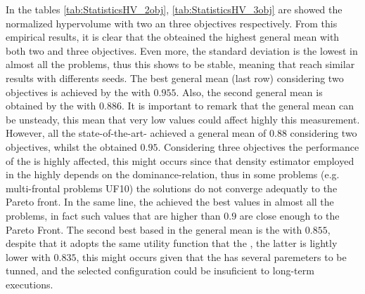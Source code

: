 In the tables \ref{tab:StatisticsHV_2obj}, \ref{tab:StatisticsHV_3obj} are showed the normalized hypervolume with two an three objectives respectively.
%
From this empirical results, it is clear that the \VSDMOEA{} obteained the highest general mean \HV{} with both two and three objectives.
%
Even more, the standard deviation is the lowest in almost all the problems, thus this \MOEA{} shows to be stable, meaning that reach similar results with differents seeds.
%
The best general mean (last row) considering two objectives is achieved by the \VSDMOEA{} with $0.955$.
%
Also, the second general mean is obtained by the \NSGAII{} with $0.886$.
%
It is important to remark that the general mean can be unsteady, this mean that very low \HV{} values could affect highly this measurement.
%
However, all the state-of-the-art-\MOEAS{} achieved a general mean of $0.88$ considering two objectives, whilst the \VSDMOEA{} obtained $0.95$.
%
Considering three objectives the performance of the \NSGAII{} is highly affected, this might occurs since that density estimator employed in the \NSGAII{} highly depends on the dominance-relation, thus in some problems (e.g. multi-frontal problems UF10) the solutions do not converge adequatly to the Pareto front.
%
In the same line, the \VSDMOEA{} achieved the best \HV{} values in almost all the problems, in fact such values that are higher than $0.9$ are close enough to the Pareto Front.
%
The second best \MOEA{} based in the general mean is the \RMOEA{} with $0.855$, despite that it adopts the same utility function that the \MOEAD{}, the latter is lightly lower with $0.835$, this might occurs given that the \MOEAD{} has several paremeters to be tunned, and the selected configuration could be insuficient to long-term executions.
%


